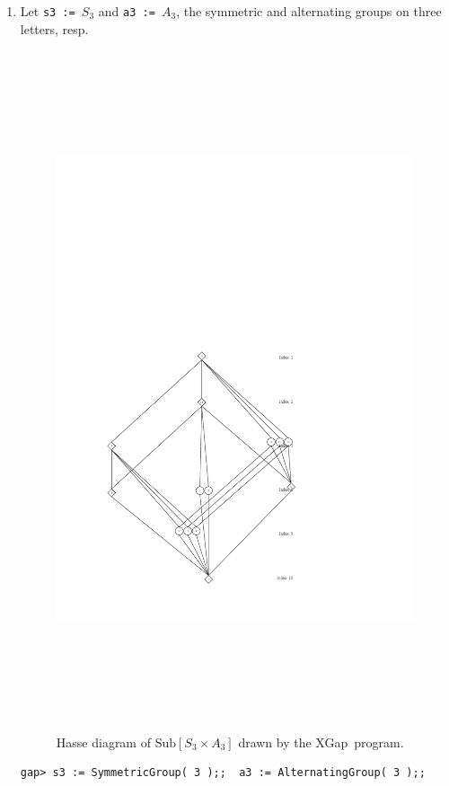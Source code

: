 \documentclass[11pt]{amsart}
\newcommand{\xgap}{XGap}   %
\theoremstyle{plain}
\newcommand{\codesize}{\footnotesize}
\newcommand{\<}{\ensuremath{\langle}}
\renewcommand{\>}{\ensuremath{\rangle}}
\newcommand{\Sub}{\ensuremath{\mathrm{Sub}}}
\begin{document}
\begin{enumerate}
\item 
Let 
{\tt s3 := $S_3$} and {\tt a3 := $A_3$}, 
the symmetric and alternating groups on three letters, resp.
\begin{figure}[!ht]\begin{center}
\vspace{-8cm}
\includegraphics[height=20cm]{s3a3new.pdf}%
\caption{Hasse diagram of $\Sub[S_3 \times A_3]$ drawn by the \xgap\ program.}
\label{fig:s3a3}
\end{center}\end{figure}
{\codesize
\begin{verbatim}
gap> s3 := SymmetricGroup( 3 );;  a3 := AlternatingGroup( 3 );;


\end{verbatim}}
\end{enumerate}
\end{document}

